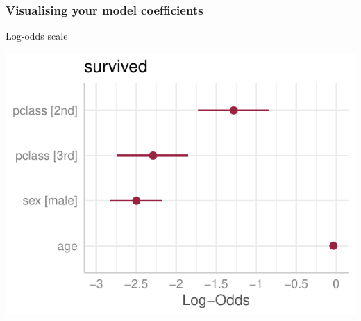 \documentclass[a4paper]{article}\usepackage[]{graphicx}\usepackage[]{xcolor}
\makeatletter
\def\maxwidth{ %
  \ifdim\Gin@nat@width>\linewidth
    \linewidth
  \else
    \Gin@nat@width
  \fi
}
\makeatother
\begin{document}
\subsubsection{Visualising your model coefficients}
\begin{minipage}[t]{0.49\textwidth}
Log-odds scale
\begin{Schunk}


{\centering \includegraphics[width=\maxwidth]{figure/listings-unnamed-chunk-416-1} 

}

\end{Schunk}
\end{minipage}
\hspace{0.02\textwidth}
\end{document}
